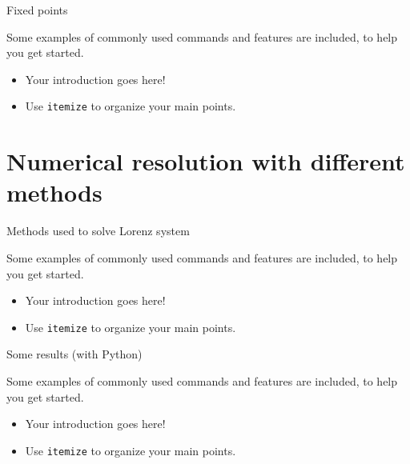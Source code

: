 \documentclass[10pt,xcolor={table,dvipsnames},t]{beamer}
\begin{document}
\begin{frame}{Fixed points}

    Some examples of commonly used commands and features are included, to help you get started.
    \begin{itemize}
      \item Your introduction goes here!
      \item Use \texttt{itemize} to organize your main points.
    \end{itemize}

\end{frame}

\section{Numerical resolution with different methods}

\begin{frame}{Methods used to solve Lorenz system}

    Some examples of commonly used commands and features are included, to help you get started.
    \begin{itemize}
      \item Your introduction goes here!
      \item Use \texttt{itemize} to organize your main points.
    \end{itemize}

\end{frame}

\begin{frame}{Some results (with Python)}

    Some examples of commonly used commands and features are included, to help you get started.
    \begin{itemize}
      \item Your introduction goes here!
      \item Use \texttt{itemize} to organize your main points.
    \end{itemize}
    
\end{frame}
\end{document}
